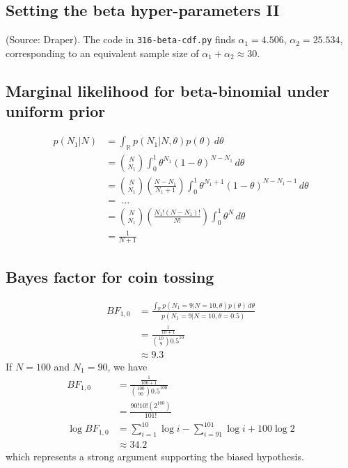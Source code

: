 \subsection{Setting the beta hyper-parameters II}
(Source: Draper). The code in \texttt{316-beta-cdf.py} finds $\alpha_1 = 4.506$, $\alpha_2 = 25.534$, corresponding to an equivalent sample size of $\alpha_1+\alpha_2 \approx 30$.

\subsection{Marginal likelihood for beta-binomial under uniform prior}
\begin{align*}
p(N_1|N) &= \int_{\mathbb{R}} p(N_1|N,\theta)p(\theta) \,d\theta\\
&= {N \choose N_1} \int_0^1 \theta^{N_1} (1-\theta)^{N-N_1} \,d\theta\\
&= {N \choose N_1} \left(\frac{N-N_1}{N_1+1}\right) \int_0^1 \theta^{N_1+1} (1-\theta)^{N-N_1-1} \,d\theta\\
&= \,\,\dots\\
&= {N \choose N_1} \left(\frac{N_1!(N-N_1)!}{N!}\right) \int_0^1 \theta^N \,d\theta\\
&= \frac{1}{N+1}
\end{align*}

\subsection{Bayes factor for coin tossing}
\begin{align*}
BF_{1,0} &= \frac{\int_{\mathbb{R}} p(N_1=9|N=10,\theta)p(\theta) \,d\theta}{p(N_1=9|N=10,\theta=0.5)}\\
&= \frac{\frac{1}{10+1}}{{10 \choose 9} 0.5^{10}}\\
&\approx 9.3
\end{align*}
If $N=100$ and $N_1=90$, we have
\begin{align*}
BF_{1,0} &= \frac{\frac{1}{100+1}}{{100 \choose 90} 0.5^{100}}\\
&= \frac{90!10!(2^{100})}{101!}\\
\log BF_{1,0} &= \sum_{i=1}^{10} \log i - \sum_{i=91}^{101} \log i + 100\log 2\\
&\approx 34.2
\end{align*}
which represents a strong argument supporting the biased hypothesis.

